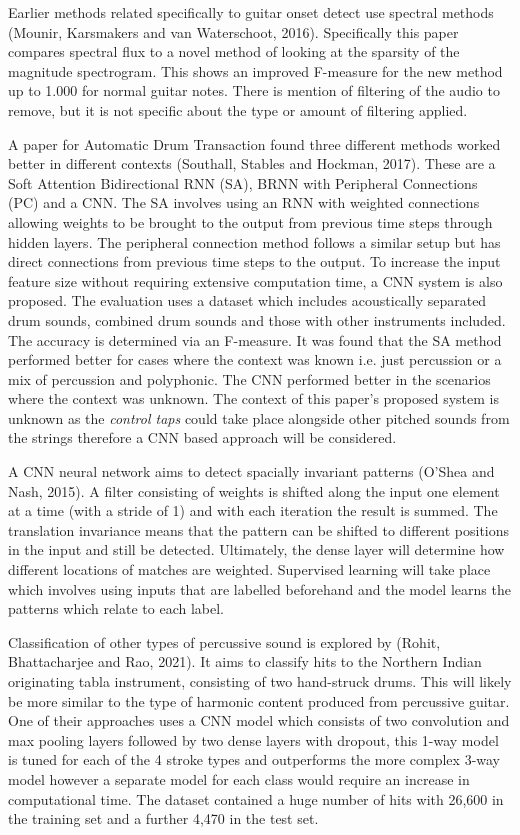 \documentclass[conference]{IEEEtran}
\begin{document}
Earlier methods related specifically to guitar onset detect use spectral methods (Mounir, Karsmakers and van Waterschoot, 2016). Specifically this paper compares spectral flux to a novel method of looking at the sparsity of the magnitude spectrogram.
This shows an improved F-measure for the new method up to 1.000 for normal guitar notes. There is mention of filtering of the audio to remove, but it is not specific about the type or amount of filtering applied. 

A paper for Automatic Drum Transaction found three different methods worked better in different contexts (Southall, Stables and Hockman, 2017). These are a Soft Attention Bidirectional RNN (SA), BRNN with Peripheral Connections (PC) and a CNN.
The SA involves using an RNN with weighted connections allowing weights to be brought to the output from previous time steps through hidden layers. The peripheral connection method follows a similar setup but has
direct connections from previous time steps to the output. To increase the input feature size without requiring extensive computation time, a CNN system is also proposed. The evaluation uses a dataset which includes acoustically
separated drum sounds, combined drum sounds and those with other instruments included. The accuracy is determined via an F-measure. 
It was found that the SA method performed better for cases where the context was known i.e. just percussion or a mix of percussion and polyphonic. The CNN performed better in the 
scenarios where the context was unknown. The context of this paper's proposed system is unknown as the \emph{control taps} could take place alongside other pitched sounds from the strings
therefore a CNN based approach will be considered. 

A CNN neural network aims to detect spacially invariant patterns (O'Shea and Nash, 2015). A filter consisting of weights is shifted along the input one element at a time (with a stride of 1) and with each iteration the result is summed.
The translation invariance means that the pattern can be shifted to different positions in the input and still be detected. Ultimately, the dense layer will determine how different locations of matches
are weighted. Supervised learning will take place which involves using inputs that are labelled beforehand and the model learns the patterns which relate to each label.

Classification of other types of percussive sound is explored by (Rohit, Bhattacharjee and Rao, 2021). It aims to classify hits to the Northern Indian originating tabla instrument, consisting of two hand-struck drums. This will likely be more similar to the
type of harmonic content produced from percussive guitar. One of their approaches uses a CNN model which consists of two convolution and max pooling layers followed by two dense layers with dropout, this 1-way model
is tuned for each of the 4 stroke types and outperforms the more complex 3-way model however a separate model for each class would require an increase in computational time. The dataset contained a huge number of hits with 26,600 in the training set and a further 4,470 in the test set. 
\end{document}
